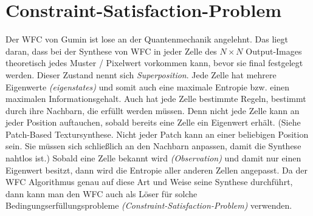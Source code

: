 \documentclass[12pt, a4paper,twoside,openright]{report} %
\begin{document}
\section{Constraint-Satisfaction-Problem}

Der WFC von Gumin ist lose an der Quantenmechanik angelehnt.
Das liegt daran, dass bei der Synthese von WFC in jeder Zelle des $N\times N$ Output-Images theoretisch jedes Muster / Pixelwert vorkommen kann, bevor sie final festgelegt werden.
Dieser Zustand nennt sich \textit{Superposition}.
Jede Zelle hat mehrere Eigenwerte \textit{(eigenstates)} und somit auch eine maximale Entropie bzw. einen maximalen Informationsgehalt.
Auch hat jede Zelle bestimmte Regeln, bestimmt durch ihre Nachbarn, die erfüllt werden müssen.
Denn nicht jede Zelle kann an jeder Position auftauchen, sobald bereits eine Zelle ein Eigenwert erhält.
{(Siehe Patch-Based Textursynthese. Nicht jeder Patch kann an einer beliebigen Position sein.
Sie müssen sich schließlich an den Nachbarn anpassen, damit die Synthese nahtlos ist.)}
Sobald eine Zelle bekannt wird \textit{(Observation)} und damit nur einen Eigenwert besitzt,
dann wird die Entropie aller anderen Zellen angepasst.
 \cite[S.5, 2.2 The wave function]{Zinkernagel_2016}
Da der WFC Algorithmus genau auf diese Art und Weise seine Synthese durchführt,
dann kann man den WFC auch als Löser für solche Bedingungserfüllungsprobleme \textit{(Constraint-Satisfaction-Problem)} verwenden.
\end{document}
